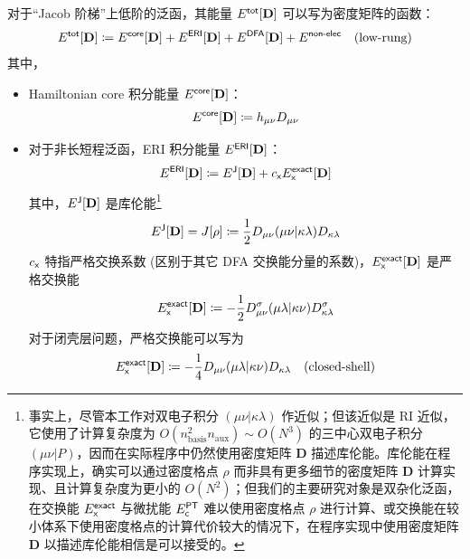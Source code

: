 对于“Jacob 阶梯”上低阶的泛函，其能量 $E^{\textsf{tot}}[\mathbf{D}]$ 可以写为密度矩阵的函数：
\begin{equation}
    E^{\textsf{tot}}[\mathbf{D}] \coloneq E^{\textsf{core}} [\mathbf{D}] + E^{\textsf{ERI}} [\mathbf{D}] + E^{\textsf{DFA}} [\mathbf{D}] + E^{\textsf{non-elec}} \quad \text{(low-rung)}
\end{equation}
其中，
\begin{itemize}[nosep]
\item Hamiltonian core 积分能量 $E^{\textsf{core}} [\mathbf{D}]$：
\begin{equation}
    E^{\textsf{core}} [\mathbf{D}] \coloneq h_{\mu \nu} D_{\mu \nu}
\end{equation}
\item 对于非长短程泛函，ERI 积分能量 $E^{\textsf{ERI}} [\mathbf{D}]$：
\begin{equation}
    \label{eq.3.def.eri}
    E^{\textsf{ERI}} [\mathbf{D}] \coloneq E^{\textsf{J}} [\mathbf{D}] + c_{\textsf{x}} E_{\textsf{x}}^{\textsf{exact}} [\mathbf{D}]
\end{equation}
其中，$E^{\textsf{J}} [\mathbf{D}]$ 是库伦能\footnote{事实上，尽管本工作对双电子积分 $(\mu \nu | \kappa \lambda)$ 作近似；但该近似是 RI 近似，它使用了计算复杂度为 $O(n_\mathrm{basis}^2 n_\mathrm{aux}) \sim O(N^3)$ 的三中心双电子积分 $(\mu \nu | P)$，因而在实际程序中仍然使用密度矩阵 $\mathbf{D}$ 描述库伦能。库伦能在程序实现上，确实可以通过密度格点 $\rho$ 而非具有更多细节的密度矩阵 $\mathbf{D}$ 计算实现、且计算复杂度为更小的 $O(N^2)$\cite{Toivanen-Sundholm.PCCP.2015}；但我们的主要研究对象是双杂化泛函，在交换能 $E_{\textsf{x}}^{\textsf{exact}}$ 与微扰能 $E_{\textsf{c}}^{\textsf{PT}}$ 难以使用密度格点 $\rho$ 进行计算、或交换能在较小体系下使用密度格点的计算代价较大\cite{IZSAK-NEESE.JCP.2011}的情况下，在程序实现中使用密度矩阵 $\mathbf{D}$ 以描述库伦能相信是可以接受的。}
\begin{equation}
    E^{\textsf{J}} [\mathbf{D}] = J[\rho] \coloneq \frac{1}{2} D_{\mu \nu} (\mu \nu | \kappa \lambda) D_{\kappa \lambda}
\end{equation}
$c_{\textsf{x}}$ 特指严格交换系数 (区别于其它 DFA 交换能分量的系数)，$E_{\textsf{x}}^{\textsf{exact}} [\mathbf{D}]$ 是严格交换能
\begin{equation}
    E_{\textsf{x}}^{\textsf{exact}} [\mathbf{D}] \coloneq - \frac{1}{2} D_{\mu \nu}^\sigma (\mu \lambda | \kappa \nu) D_{\kappa \lambda}^\sigma
\end{equation}
对于闭壳层问题，严格交换能可以写为
\begin{equation}
    E_\textmt{x}^\textmt{exact} [\mathbf{D}] \coloneq - \frac{1}{4} D_{\mu \nu} (\mu \lambda | \kappa \nu) D_{\kappa \lambda} \quad \text{(closed-shell)}

\end{equation}
\end{itemize}
